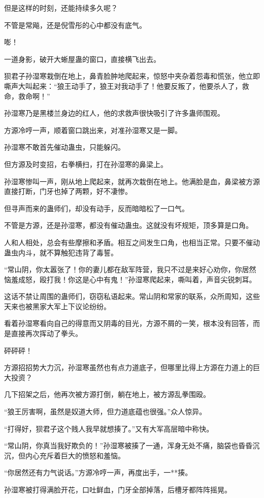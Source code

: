 \begin{this_body}
但是这样的时刻，还能持续多久呢？

不管是常飚，还是倪雪彤的心中都没有底气。

嘭！

一道身影，破开大蜥屋蛊的窗口，直接横飞出去。

狈君子孙湿寒栽倒在地上，鼻青脸肿地爬起来，惊怒中夹杂着怨毒和慌张，他立即嘶声大叫起来：“狼王动手了，狼王对我动手了！他要反叛了，他要杀人了，救命，救命啊！”

孙湿寒乃是黑楼兰身边的红人，他的求救声很快吸引了许多蛊师围观。

方源冷哼一声，顺着窗口跳出来，对准孙湿寒又是一脚。

孙湿寒不敢首先催动蛊虫，只能躲闪。

但方源及时变招，右拳横扫，打在孙湿寒的鼻梁上。

孙湿寒惨叫一声，刚从地上爬起来，就再次栽倒在地上。他满脸是血，鼻梁被方源直接打断，门牙也掉了两颗，好不凄惨。

但寻声而来的蛊师们，却没有动手，反而暗暗松了一口气。

不管是方源，还是孙湿寒，都没有催动蛊虫。这就没有坏规矩，顶多算是口角。

人和人相处，总会有些摩擦和矛盾。相互之间发生口角，也相当正常。只要不催动蛊虫内斗，就不算触犯违背了毒誓。

“常山阴，你太嚣张了！你的妻儿都在敌军阵营，我只不过是来好心劝你，你居然恼羞成怒，殴打我！你这是心中有鬼！”孙湿寒爬起来，嘶叫着，声音尖锐刺耳。

这话不禁让周围的蛊师们，窃窃私语起来。常山阴和常家的联系，众所周知，这些天来也被黑家大军上下议论纷纷。

看着孙湿寒看向自己的得意而又阴毒的目光，方源不屑的一笑，根本没有回答，而是直接再次挥动了拳头。

砰砰砰！

方源招招势大力沉，孙湿寒虽然也有点力道底子，但哪里比得上方源在力道上的巨大投资？

几下招架之后，他再次被方源打倒，躺在地上，被方源乱拳围殴。

“狼王厉害啊，虽然是奴道大师，但力道底蕴也很强。”众人惊异。

“打得好，狈君子这个贱人我早就想揍了。”又有大军高层暗中称快。

“常山阴，你真当我好欺负的！”孙湿寒被揍了一通，浑身无处不痛，脑袋也昏昏沉沉，但内心充斥着巨大的愤怒和羞恼。

“你居然还有力气说话。”方源冷哼一声，再度出手，一**揍。

孙湿寒被打得满脸开花，口吐鲜血，门牙全部掉落，后槽牙都阵阵摇晃。


\end{this_body}

